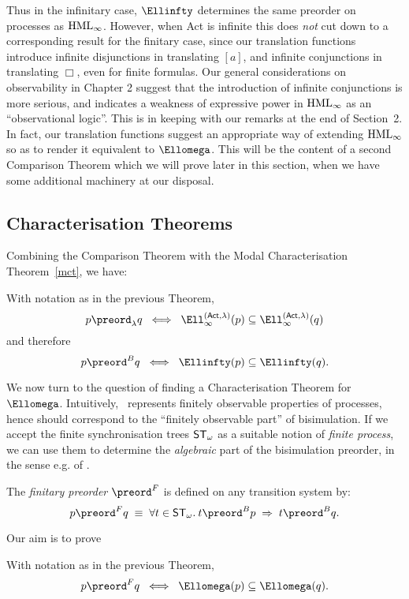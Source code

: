 Thus in the infinitary case, $\Ellinfty$ determines the same preorder on processes as ${\rm HML}_{\infty}$.
However, when {\sf Act} is infinite this does {\em not} cut down to a corresponding result for the finitary case, since our
translation functions introduce infinite disjunctions in translating $[a]$, and infinite conjunctions in translating $\Box$, even for finite formulas.
Our general considerations on observability in Chapter 2 suggest that the introduction of infinite conjunctions is more serious, and indicates a weakness of expressive power in ${\rm HML}_{\infty}$ as an ``observational logic''.
This is in keeping with our remarks at the end of Section~2.
In fact, our translation functions suggest an appropriate way of extending ${\rm HML}_{\infty}$ so as to render it equivalent to $\Ellomega$.
This will be the content of a second Comparison Theorem which we will prove later in this section, when we have some additional machinery at our disposal.

\subsection*{Characterisation Theorems}
Combining the Comparison Theorem with the Modal Characterisation Theorem~\ref{mct}, we have:
\begin{theorem}
\label{linfct}
With notation as in the previous Theorem,
\[ p {\preord}_{\lambda} q \;\; \Longleftrightarrow \;\; {\Ell}^{({\sf Act}, \lambda )}_{\infty}(p) \subseteq {\Ell}^{({\sf Act}, \lambda )}_{\infty}(q) \]
and therefore
\[ p \preord^{B} q \;\; \Longleftrightarrow \;\; {\Ellinfty}(p) \subseteq {\Ellinfty}(q) . \]
\end{theorem}

We now turn to the question of finding a Characterisation Theorem for $\Ellomega$.
Intuitively, \Ellomega\ represents finitely observable properties of processes, hence should correspond to the ``finitely observable part'' of bisimulation.
If we accept the finite synchronisation trees ${\sf ST}_{\omega}$ as a suitable notion of {\em finite process}, we can use them to determine the {\em algebraic} part of the bisimulation preorder, in the sense e.g. of \cite{Gue81}.
\begin{definition}
{\rm The {\em finitary preorder} $\preord^{F}$ is defined on any transition system by:}
\[ p \preord^{F} q \; \equiv \; \forall t \in {\sf ST}_{\omega}. \: t \preord^{B} p \; \Rightarrow \; t \preord^{B} q . \]
\end{definition}
Our aim is to prove
\begin{theorem}
\label{lct}
With notation as in the previous Theorem,
\[ p \preord^{F} q \;\; \Longleftrightarrow \;\; \Ellomega (p) \subseteq \Ellomega (q). \]
\end{theorem}

